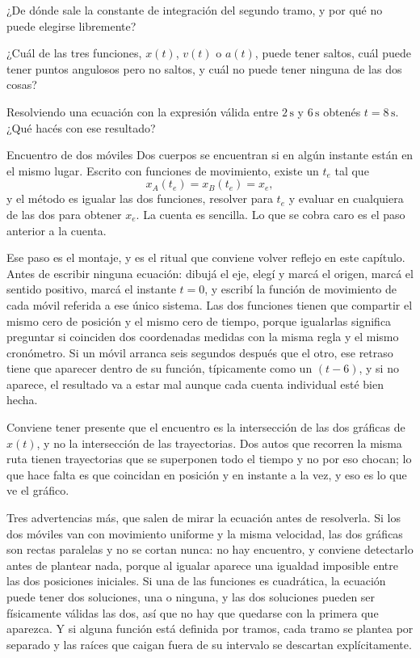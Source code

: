 \documentclass[11pt,openany]{book}
\begin{document}
\begin{chequeo}
\item ¿De dónde sale la constante de integración del segundo tramo, y por qué no puede elegirse libremente?
\item ¿Cuál de las tres funciones, $x(t)$, $v(t)$ o $a(t)$, puede tener saltos, cuál puede tener puntos angulosos pero no saltos, y cuál no puede tener ninguna de las dos cosas?
\item Resolviendo una ecuación con la expresión válida entre $2\,\mathrm{s}$ y $6\,\mathrm{s}$ obtenés $t = 8\,\mathrm{s}$. ¿Qué hacés con ese resultado?
\end{chequeo}

\begin{bloque}{Encuentro de dos móviles}
Dos cuerpos se encuentran si en algún instante están en el mismo lugar. Escrito con funciones de movimiento, existe un $t_e$ tal que
\[
x_A(t_e) = x_B(t_e) = x_e,
\]
y el método es igualar las dos funciones, resolver para $t_e$ y evaluar en cualquiera de las dos para obtener $x_e$. La cuenta es sencilla. Lo que se cobra caro es el paso anterior a la cuenta.

Ese paso es el montaje, y es el ritual que conviene volver reflejo en este capítulo. Antes de escribir ninguna ecuación: dibujá el eje, elegí y marcá el origen, marcá el sentido positivo, marcá el instante $t=0$, y escribí la función de movimiento de cada móvil referida a ese único sistema. Las dos funciones tienen que compartir el mismo cero de posición y el mismo cero de tiempo, porque igualarlas significa preguntar si coinciden dos coordenadas medidas con la misma regla y el mismo cronómetro. Si un móvil arranca seis segundos después que el otro, ese retraso tiene que aparecer dentro de su función, típicamente como un $(t-6)$, y si no aparece, el resultado va a estar mal aunque cada cuenta individual esté bien hecha.

Conviene tener presente que el encuentro es la intersección de las dos gráficas de $x(t)$, y no la intersección de las trayectorias. Dos autos que recorren la misma ruta tienen trayectorias que se superponen todo el tiempo y no por eso chocan; lo que hace falta es que coincidan en posición y en instante a la vez, y eso es lo que ve el gráfico.

Tres advertencias más, que salen de mirar la ecuación antes de resolverla. Si los dos móviles van con movimiento uniforme y la misma velocidad, las dos gráficas son rectas paralelas y no se cortan nunca: no hay encuentro, y conviene detectarlo antes de plantear nada, porque al igualar aparece una igualdad imposible entre las dos posiciones iniciales. Si una de las funciones es cuadrática, la ecuación puede tener dos soluciones, una o ninguna, y las dos soluciones pueden ser físicamente válidas las dos, así que no hay que quedarse con la primera que aparezca. Y si alguna función está definida por tramos, cada tramo se plantea por separado y las raíces que caigan fuera de su intervalo se descartan explícitamente.


\end{bloque}
\end{document}
